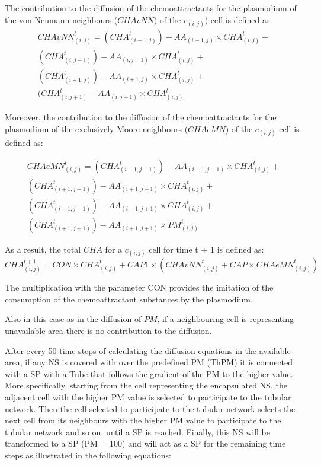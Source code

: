 \par
The contribution to the diffusion of the chemoattractants for the plasmodium of the von Neumann neighbours ($CHAvNN$) of the $c_{(i,j)}$) cell is defined as:
\begin{equation}
\begin{split}
CHAvNN^t_{(i, j)} = 
(CHA^t_{(i-1, j)}) - AA_{(i-1, j)} \times CHA^t_{(i, j)} +
\\(CHA^t_{(i, j-1)}) - AA_{(i, j-1)} \times CHA^t_{(i, j)} +
\\(CHA^t_{(i+1, j)}) - AA_{(i+1, j)} \times CHA^t_{(i, j)}  +
\\(CHA^t_{(i, j+1)} - AA_{(i, j+1)} \times CHA^t_{(i, j)}
\end{split}
\end{equation}

Moreover, the contribution to the diffusion of the chemoattractants for the plasmodium of the exclusively Moore neighbours ($CHAeMN$) of the $c_{(i,j)}$ cell is defined as:

\begin{equation}
\begin{split}
CHAeMN^t_{(i, j)} = 
(CHA^t_{(i-1, j-1)}) - AA_{(i-1, j-1)} \times CHA^t_{(i, j)} +
\\(CHA^t_{(i+1, j-1)}) - AA_{(i+1, j-1)} \times CHA^t_{(i, j)} +
\\(CHA^t_{(i-1, j+1)}) - AA_{(i-1, j+1)} \times CHA^t_{(i, j)}  +
\\(CHA^t_{(i+1, j+1)}) - AA_{(i+1, j+1)} \times PM^t_{(i, j)}
\end{split}
\end{equation}

As a result, the total $CHA$ for a $c_{(i,j)}$ cell for time t + 1 is defined as:
\begin{equation}
CHA^{t+1}_{(i, j)} = CON \times {CHA^t_{(i, j)} + CAP1 \times (CHAvNN^t_{(i, j)} + CAP \times CHAeMN^t_{(i, j)})}
\end{equation}

\par
The multiplication with the parameter CON provides the imitation of the consumption of the chemoattractant substances by the plasmodium.
\par
Also in this case as in the diffusion of $PM$, if a neighbouring cell is representing unavailable area there is no contribution to the diffusion.
\par
After every 50 time steps of calculating the diffusion equations in the available area, if any NS is covered with over the predefined PM (ThPM) it is connected with a SP with a Tube that follows the gradient of the PM to the higher value. More specifically, starting from the cell representing the encapsulated NS, the adjacent cell with the higher PM value is selected to participate to the tubular network. Then the cell selected to participate to the tubular network selects the next cell from its neighbours with the higher PM value to participate to the tubular network and so on, until a SP is reached.
Finally, this NS will be transformed to a SP (PM = 100) and will act as a SP for the remaining time steps as illustrated in the following equations:

